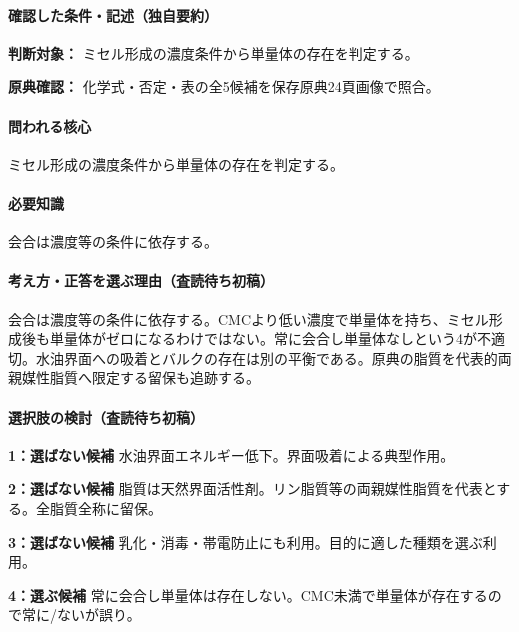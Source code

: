 \paragraph{確認した条件・記述（独自要約）}\mbox{}\par

\noindent\textbf{判断対象：} ミセル形成の濃度条件から単量体の存在を判定する。\par

\noindent\textbf{原典確認：} 化学式・否定・表の全5候補を保存原典24頁画像で照合。\par

\paragraph{問われる核心} ミセル形成の濃度条件から単量体の存在を判定する。

\paragraph{必要知識} 会合は濃度等の条件に依存する。

\paragraph{考え方・正答を選ぶ理由（査読待ち初稿）} 会合は濃度等の条件に依存する。CMCより低い濃度で単量体を持ち、ミセル形成後も単量体がゼロになるわけではない。常に会合し単量体なしという4が不適切。水油界面への吸着とバルクの存在は別の平衡である。原典の脂質を代表的両親媒性脂質へ限定する留保も追跡する。

\paragraph{選択肢の検討（査読待ち初稿）}\mbox{}\par

\noindent\textbf{1：選ばない候補} 水油界面エネルギー低下。界面吸着による典型作用。\par

\noindent\textbf{2：選ばない候補} 脂質は天然界面活性剤。リン脂質等の両親媒性脂質を代表とする。全脂質全称に留保。\par

\noindent\textbf{3：選ばない候補} 乳化・消毒・帯電防止にも利用。目的に適した種類を選ぶ利用。\par

\noindent\textbf{4：選ぶ候補} 常に会合し単量体は存在しない。CMC未満で単量体が存在するので常に/ないが誤り。\par

